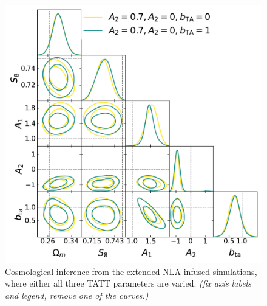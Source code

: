 \begin{figure}
\includegraphics[width=\columnwidth]{graphs/delta_NLA.pdf}
\caption{Cosmological inference from the extended NLA-infused simulations, where either all three TATT parameters are varied.  {\it(fix axis labels and legend, remove one of the curves.)}}
\label{fig:triangle_deltaNLA_combo}
\end{figure}